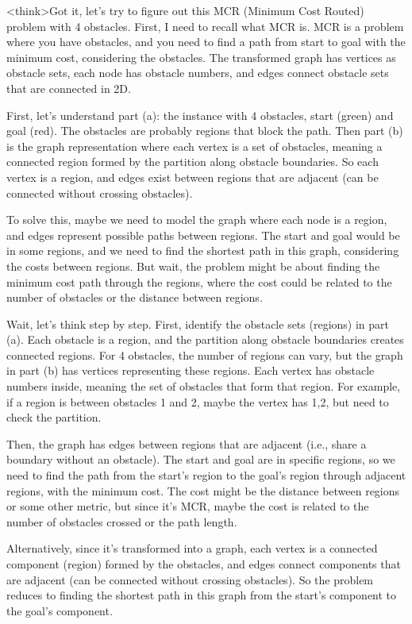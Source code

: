 <think>Got it, let's try to figure out this MCR (Minimum Cost Routed) problem with 4 obstacles. First, I need to recall what MCR is. MCR is a problem where you have obstacles, and you need to find a path from start to goal with the minimum cost, considering the obstacles. The transformed graph has vertices as obstacle sets, each node has obstacle numbers, and edges connect obstacle sets that are connected in 2D.

First, let's understand part (a): the instance with 4 obstacles, start (green) and goal (red). The obstacles are probably regions that block the path. Then part (b) is the graph representation where each vertex is a set of obstacles, meaning a connected region formed by the partition along obstacle boundaries. So each vertex is a region, and edges exist between regions that are adjacent (can be connected without crossing obstacles).

To solve this, maybe we need to model the graph where each node is a region, and edges represent possible paths between regions. The start and goal would be in some regions, and we need to find the shortest path in this graph, considering the costs between regions. But wait, the problem might be about finding the minimum cost path through the regions, where the cost could be related to the number of obstacles or the distance between regions.

Wait, let's think step by step. First, identify the obstacle sets (regions) in part (a). Each obstacle is a region, and the partition along obstacle boundaries creates connected regions. For 4 obstacles, the number of regions can vary, but the graph in part (b) has vertices representing these regions. Each vertex has obstacle numbers inside, meaning the set of obstacles that form that region. For example, if a region is between obstacles 1 and 2, maybe the vertex has {1,2}, but need to check the partition.

Then, the graph has edges between regions that are adjacent (i.e., share a boundary without an obstacle). The start and goal are in specific regions, so we need to find the path from the start's region to the goal's region through adjacent regions, with the minimum cost. The cost might be the distance between regions or some other metric, but since it's MCR, maybe the cost is related to the number of obstacles crossed or the path length.

Alternatively, since it's transformed into a graph, each vertex is a connected component (region) formed by the obstacles, and edges connect components that are adjacent (can be connected without crossing obstacles). So the problem reduces to finding the shortest path in this graph from the start's component to the goal's component.

